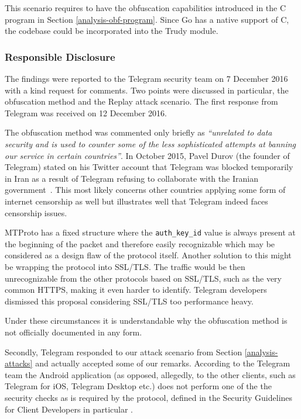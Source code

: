 \documentclass[thesis=M,english]{FITthesis}[2012/10/20]
\begin{document}
This scenario requires to have the obfuscation capabilities introduced in the C program in Section \ref{analysis-obf-program}. Since Go has a native support of C, the codebase could be incorporated into the Trudy module.


\subsubsection{Responsible Disclosure}

The findings were reported to the Telegram security team on 7 December 2016 with a kind request for comments. Two points were discussed in particular, the obfuscation method and the Replay attack scenario. The first response from Telegram was received on 12 December 2016.

The obfuscation method was commented only briefly as \emph{``unrelated to data security and is used to counter some of the less sophisticated attempts at banning our service in certain countries''}. In October 2015, Pavel Durov (the founder of Telegram) stated on his Twitter account that Telegram was blocked temporarily in Iran as a result of Telegram refusing to collaborate with the Iranian government~\cite{telegram-durov-iran}. This most likely concerns other countries applying some form of internet censorship as well but illustrates well that Telegram indeed faces censorship issues.

MTProto has a fixed structure where the \texttt{auth\_key\_id} value is always present at the beginning of the packet and therefore easily recognizable which may be considered as a design flaw of the protocol itself. Another solution to this might be wrapping the protocol into SSL/TLS. The traffic would be then unrecognizable from the other protocols based on SSL/TLS, such as the very common HTTPS, making it even harder to identify. Telegram developers dismissed this proposal considering SSL/TLS too performance heavy.

Under these circumstances it is understandable why the obfuscation method is not officially documented in any form.

Secondly, Telegram responded to our attack scenario from Section \ref{analysis-attacks} and actually accepted some of our remarks. According to the Telegram team the Android application (as opposed, allegedly, to the other clients, such as Telegram for iOS, Telegram Desktop etc.) does not perform one of the the security checks as is required by the protocol, defined in the Security Guidelines for Client Developers in particular \cite{telegram-security-guideline}.
\end{document}
